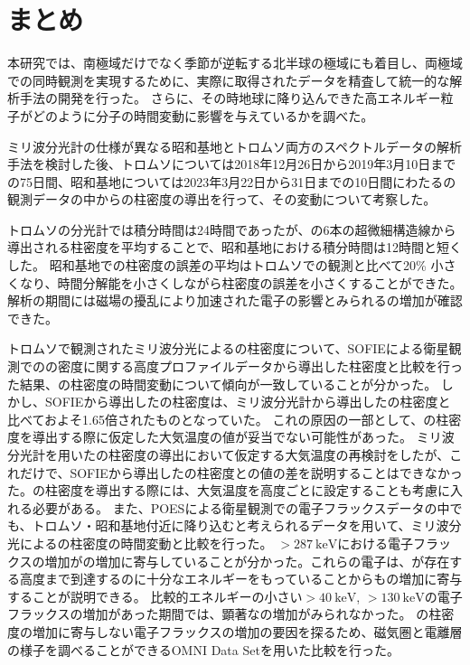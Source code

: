\chapter{まとめ}
本研究では、南極域だけでなく季節が逆転する北半球の極域にも着目し、両極域での同時観測を実現するために、実際に取得されたデータを精査して統一的な解析手法の開発を行った。
さらに、その時地球に降り込んできた高エネルギー粒子がどのように分子の時間変動に影響を与えているかを調べた。
\par
ミリ波分光計の仕様が異なる昭和基地とトロムソ両方のスペクトルデータの解析手法を検討した後、トロムソについては2018年12月26日から2019年3月10日までの75日間、昭和基地については2023年3月22日から31日までの10日間にわたるの観測データの中からの柱密度の導出を行って、その変動について考察した。
\par
トロムソの分光計では積分時間は24時間であったが、の6本の超微細構造線から導出される柱密度を平均することで、昭和基地における積分時間は12時間と短くした。
昭和基地での柱密度の誤差の平均はトロムソでの観測と比べて20\% 小さくなり、時間分解能を小さくしながら柱密度の誤差を小さくすることができた。
解析の期間には磁場の擾乱により加速された電子の影響とみられるの増加が確認できた。
\par
トロムソで観測されたミリ波分光によるの柱密度について、SOFIEによる衛星観測でのの密度に関する高度プロファイルデータから導出した柱密度と比較を行った結果、の柱密度の時間変動について傾向が一致していることが分かった。
しかし、SOFIEから導出したの柱密度は、ミリ波分光計から導出したの柱密度と比べておよそ1.65倍されたものとなっていた。
これの原因の一部として、の柱密度を導出する際に仮定した大気温度の値が妥当でない可能性があった。
ミリ波分光計を用いたの柱密度の導出において仮定する大気温度の再検討をしたが、これだけで、SOFIEから導出したの柱密度との値の差を説明することはできなかった。の柱密度を導出する際には、大気温度を高度ごとに設定することも考慮に入れる必要がある。
また、POESによる衛星観測での電子フラックスデータの中でも、トロムソ・昭和基地付近に降り込むと考えられるデータを用いて、ミリ波分光によるの柱密度の時間変動と比較を行った。
$>287\ \mathrm{keV}$における電子フラックスの増加がの増加に寄与していることが分かった。これらの電子は、が存在する高度まで到達するのに十分なエネルギーをもっていることからもの増加に寄与することが説明できる。
比較的エネルギーの小さい$>40\ \mathrm{keV}$, $>130\ \mathrm{keV}$の電子フラックスの増加があった期間では、顕著なの増加がみられなかった。
の柱密度の増加に寄与しない電子フラックスの増加の要因を探るため、磁気圏と電離層の様子を調べることができるOMNI Data Setを用いた比較を行った。

